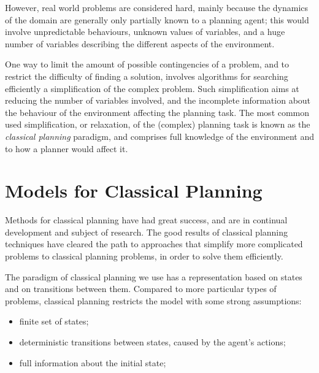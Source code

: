 However, real world problems are considered hard, mainly because 
the dynamics of the domain are generally only partially known to 
a planning agent; this would involve unpredictable behaviours, 
unknown values of variables, and a huge number of variables describing
the different aspects of the environment.%


One way to limit the amount of possible contingencies of a problem,
and to restrict the difficulty of finding a solution,
involves algorithms for searching efficiently a
simplification of the complex problem.
Such simplification aims at reducing the number of variables involved,
and the incomplete information about the behaviour of the environment affecting
 the planning task. 
The most common used simplification, or relaxation, of the (complex) planning task
is known as the \emph{classical planning} paradigm, and comprises
full knowledge of the environment and to how a planner would affect it.


\section{Models for Classical Planning}
Methods for classical planning have had great success, and are in
continual development and subject of research.
The good results of classical planning techniques have cleared the path to
approaches that simplify more complicated problems to classical planning problems,
in order to solve them efficiently.
%

The paradigm of classical planning we use has a representation based
on states and on transitions between them.  Compared to more
particular types of problems, classical planning restricts the model
with some strong assumptions:
\begin{itemize}
 \item finite set of states;
 \item  deterministic transitions between states, caused by the agent's actions;
 \item full information about the initial state;
\end{itemize}


